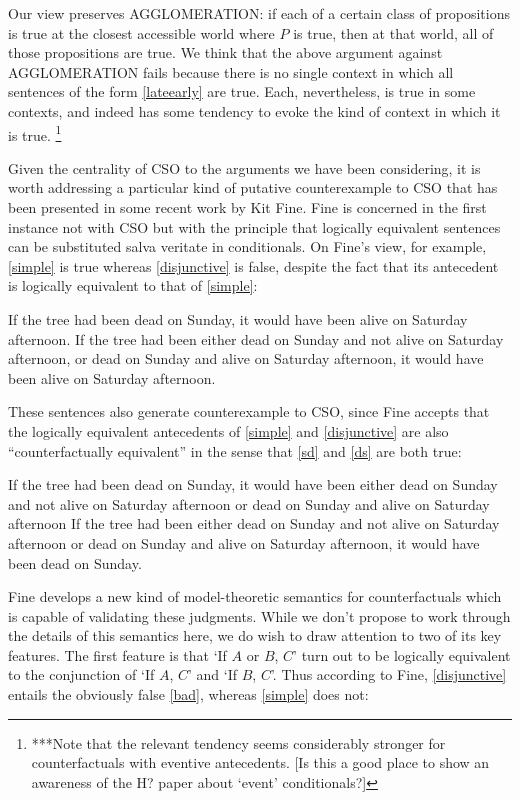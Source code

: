 \documentclass[If.tex]{subfiles}
\begin{document}
\begin{prop}
Our view preserves AGGLOMERATION: if each of a certain class of propositions is true at the closest accessible world where $P$ is true, then at that world, all of those propositions are true. We think that the above argument against AGGLOMERATION fails because there is no single context in which all sentences of the form \ref{lateearly} are true. Each, nevertheless, is true in some contexts, and indeed has some tendency to evoke the kind of context in which it is true.%
\footnote{***Note that the relevant tendency seems considerably stronger for counterfactuals with eventive antecedents. [Is this a good place to show an awareness of the H? paper about ‘event’ conditionals?]}

Given the centrality of CSO to the arguments we have been considering, it is worth addressing a particular kind of putative counterexample to CSO that has been presented in some recent work by Kit Fine. Fine is concerned in the first instance not with CSO but with the principle that logically equivalent sentences can be substituted salva veritate in conditionals. On Fine's view, for example, \ref{simple} is true whereas \ref{disjunctive} is false, despite the fact that its antecedent is logically equivalent to that of \ref{simple}:
\begin{prop}
	\nitem \label{simple}
		If the tree had been dead on Sunday, it would have been alive on Saturday afternoon.
	\nitem \label{disjunctive}
		If the tree had been either dead on Sunday and not alive on Saturday afternoon, or dead on Sunday and alive on Saturday afternoon, it would have been alive on Saturday afternoon.
\end{prop}
These sentences also generate counterexample to CSO, since Fine accepts that the logically equivalent antecedents of \ref{simple} and \ref{disjunctive} are also “counterfactually equivalent” in the sense that \ref{sd} and \ref{ds} are both true:
\begin{prop}
	\nitem \label{sd}
		If the tree had been dead on Sunday, it would have been either dead on Sunday and not alive on Saturday afternoon or dead on Sunday and alive on Saturday afternoon
	\nitem \label{ds}
		If the tree had been either dead on Sunday and not alive on Saturday afternoon or dead on Sunday and alive on Saturday afternoon, it would have been dead on Sunday.
\end{prop}
Fine develops a new kind of model-theoretic semantics for counterfactuals which is capable of validating these judgments. While we don't propose to work through the details of this semantics here, we do wish to draw attention to two of its key features. The first feature is that ‘If $A$ or $B$, $C$’ turn out to be logically equivalent to the conjunction of ‘If $A$, $C$’ and ‘If $B$, $C$’. Thus according to Fine, \ref{disjunctive} entails the obviously false \ref{bad}, whereas \ref{simple} does not:

\end{prop}
\end{document}
